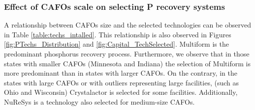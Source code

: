 \documentclass[authoryear]{elsarticle}
\begin{document}
\subsubsection{Effect of CAFOs scale on selecting P recovery systems}

A relationship between CAFOs size and the selected technologies can be observed in Table \ref{table:techs_intalled}.
This relationship is also observed in Figures \ref{fig:PTechs_Distribution} and \ref{fig:Capital_TechSelected}.
Multiform is the predominant phosphorus recovery process. Furthermore, we observe that in those states with smaller CAFOs (Minnesota and Indiana) the selection of Multiform is more predominant than in states with larger CAFOs. On the contrary, in the states with large CAFOs or with outliers representing large facilities, (such as Ohio and Wisconsin) Crystalactor is selected for some facilities.
Additionally, NuReSys is a technology also selected for medium-size CAFOs.
\end{document}
